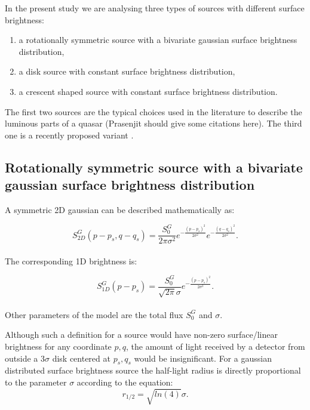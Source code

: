In the present study we are analysing three types of sources with different surface brightness: 
\begin{enumerate}
 \renewcommand{\theenumi}{(\arabic{enumi})}
  \item a rotationally symmetric source with a bivariate gaussian surface brightness distribution,
  \item a disk source with constant surface brightness distribution,
  \item a crescent shaped source with constant surface brightness distribution.
\end{enumerate}
The first two sources are the typical choices used in the literature to describe the luminous parts of a quasar (Prasenjit should give some citations here). The third one is a recently proposed
variant \citep{2013MNRAS.434..765K}.




\subsection{Rotationally symmetric source with a bivariate gaussian surface brightness distribution}

A symmetric 2D gaussian can be described mathematically as:

\begin{equation}
 S_{2D}^G(p-p_s, q-q_s) = \frac{S_0^G}{2 \pi \sigma^2} e^{-\frac{(p-p_s)^2}{2 \sigma^2}} e^{-\frac{(q-q_s)^2}{2 \sigma^2}}.
\end{equation}
\\
The corresponding 1D brightness is:

\begin{equation}
 S_{1D}^G(p-p_s) = \frac{S_0^G}{\sqrt{2 \pi} \sigma} e^{-\frac{(p-p_s)^2}{2 \sigma^2}}.
\end{equation}
\\
Other parameters of the model are the total flux $S_0^G$ and $\sigma$. 

Although such a definition for a source would have non-zero surface/linear brightness for any coordinate $p,q$, the amount of light received by a detector from outside a $3 \sigma$ disk centered at $p_s, q_s$ 
would be insignificant. For a gaussian distributed surface brightness source the half-light radius is directly proportional to the parameter $\sigma$ according to the equation:
\begin{equation}
r_{1/2} = \sqrt{ln(4)} \sigma.
\end{equation}

